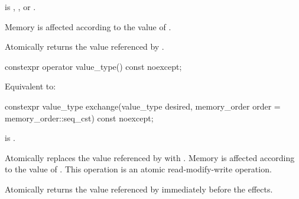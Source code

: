 \begin{itemdescr}
\pnum
\expects
{} is
,
, or
.

\pnum
\effects
Memory is affected according to the value of .

\pnum
\returns
Atomically returns the value referenced by .
\end{itemdescr}

%
%
%
%
\begin{itemdecl}
constexpr operator value_type() const noexcept;
\end{itemdecl}

\begin{itemdescr}
\pnum
\effects
Equivalent to: 
\end{itemdescr}

%
%
%
%
\begin{itemdecl}
constexpr value_type exchange(value_type desired,
                              memory_order order = memory_order::seq_cst) const noexcept;
\end{itemdecl}

\begin{itemdescr}
\pnum
\constraints
{} is .

\pnum
\effects
Atomically replaces the value referenced by 
with .
Memory is affected according to the value of .
This operation is an atomic read-modify-write operation.

\pnum
\returns
Atomically returns the value referenced by 
immediately before the effects.
\end{itemdescr}

